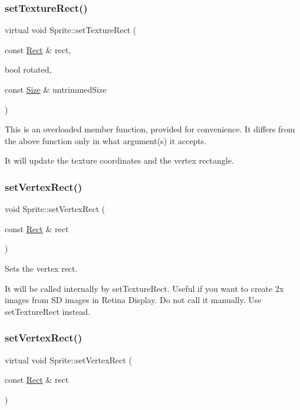 \subsubsection{\texorpdfstring{set\+Texture\+Rect()}{setTextureRect()}\hspace{0.1cm}{\footnotesize\ttfamily [4/4]}}
{\footnotesize\ttfamily virtual void Sprite\+::set\+Texture\+Rect (\begin{DoxyParamCaption}\item[{const \hyperlink{classRect}{Rect} \&}]{rect,  }\item[{bool}]{rotated,  }\item[{const \hyperlink{classSize}{Size} \&}]{untrimmed\+Size }\end{DoxyParamCaption})\hspace{0.3cm}{\ttfamily [virtual]}}

This is an overloaded member function, provided for convenience. It differs from the above function only in what argument(s) it accepts.

It will update the texture coordinates and the vertex rectangle. \mbox{\label{classSprite_ac3c895e0b1de4273fe1ea121cdfde0f0}} 
\subsubsection{\texorpdfstring{set\+Vertex\+Rect()}{setVertexRect()}\hspace{0.1cm}{\footnotesize\ttfamily [1/2]}}
{\footnotesize\ttfamily void Sprite\+::set\+Vertex\+Rect (\begin{DoxyParamCaption}\item[{const \hyperlink{classRect}{Rect} \&}]{rect }\end{DoxyParamCaption})\hspace{0.3cm}{\ttfamily [virtual]}}

Sets the vertex rect.

It will be called internally by set\+Texture\+Rect. Useful if you want to create 2x images from SD images in Retina Display. Do not call it manually. Use set\+Texture\+Rect instead. \mbox{\label{classSprite_a8ce2bc7281eb971bcc6e9f2a85d82833}} 
\subsubsection{\texorpdfstring{set\+Vertex\+Rect()}{setVertexRect()}\hspace{0.1cm}{\footnotesize\ttfamily [2/2]}}
{\footnotesize\ttfamily virtual void Sprite\+::set\+Vertex\+Rect (\begin{DoxyParamCaption}\item[{const \hyperlink{classRect}{Rect} \&}]{rect }\end{DoxyParamCaption})\hspace{0.3cm}{\ttfamily [virtual]}}

